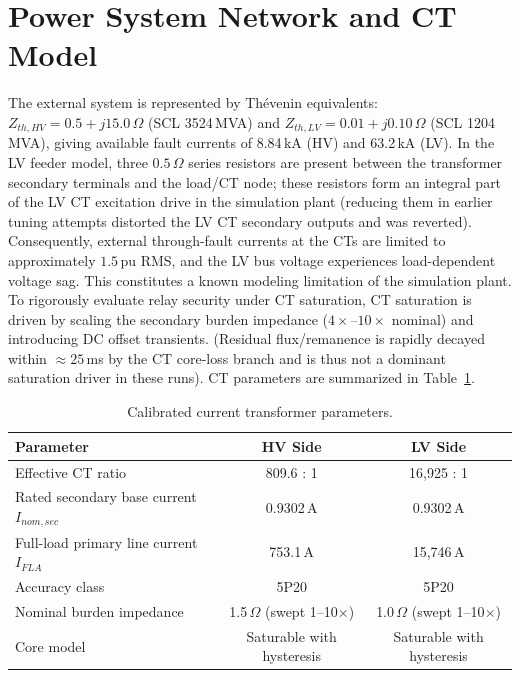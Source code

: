 \documentclass[12pt,a4paper,oneside]{report}
\begin{document}
\section{Power System Network and CT Model}
The external system is represented by Th\'evenin equivalents: $Z_{th,HV}=0.5+j15.0\,\Omega$ (SCL 3524\,MVA) and $Z_{th,LV}=0.01+j0.10\,\Omega$ (SCL 1204\,MVA), giving available fault currents of 8.84\,kA (HV) and 63.2\,kA (LV). In the LV feeder model, three $0.5\,\Omega$ series resistors are present between the transformer secondary terminals and the load/CT node; these resistors form an integral part of the LV CT excitation drive in the simulation plant (reducing them in earlier tuning attempts distorted the LV CT secondary outputs and was reverted). Consequently, external through-fault currents at the CTs are limited to approximately $1.5$\,pu RMS, and the LV bus voltage experiences load-dependent voltage sag. This constitutes a known modeling limitation of the simulation plant. To rigorously evaluate relay security under CT saturation, CT saturation is driven by scaling the secondary burden impedance ($4\times\text{--}10\times$ nominal) and introducing DC offset transients. (Residual flux/remanence is rapidly decayed within $\approx 25$\,ms by the CT core-loss branch and is thus not a dominant saturation driver in these runs). CT parameters are summarized in Table~\ref{tab:4.2}.
\begin{table}[H]\centering\caption{Calibrated current transformer parameters.}\label{tab:4.2}
\begin{tabular}{@{}lcc@{}}\toprule \textbf{Parameter} & \textbf{HV Side} & \textbf{LV Side}\\ \midrule
Effective CT ratio & 809.6 : 1 & 16,925 : 1\\
Rated secondary base current $I_{nom,sec}$ & 0.9302\,A & 0.9302\,A\\
Full-load primary line current $I_{FLA}$ & 753.1\,A & 15{,}746\,A\\
Accuracy class & 5P20 & 5P20\\
Nominal burden impedance & 1.5\,$\Omega$ (swept 1--10$\times$) & 1.0\,$\Omega$ (swept 1--10$\times$)\\
Core model & Saturable with hysteresis & Saturable with hysteresis\\ \bottomrule
\end{tabular}\end{table}
\end{document}
